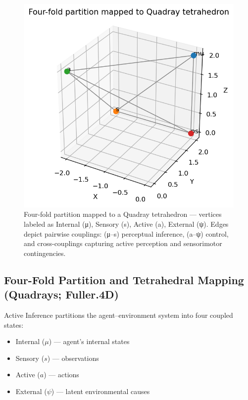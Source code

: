 \documentclass[
]{article}
\providecommand{\tightlist}{%
  \setlength{\itemsep}{0pt}\setlength{\parskip}{0pt}}
\begin{document}
\begin{figure}
\hypertarget{fig:partition_tetrahedron}{%
\centering
\includegraphics{../output/partition_tetrahedron.png}
\caption{Four-fold partition mapped to a Quadray tetrahedron ---
vertices labeled as Internal (μ), Sensory (s), Active (a), External (ψ).
Edges depict pairwise couplings: (μ--s) perceptual inference, (a--ψ)
control, and cross-couplings capturing active perception and
sensorimotor contingencies.}\label{fig:partition_tetrahedron}
}
\end{figure}

\hypertarget{four-fold-partition-and-tetrahedral-mapping-quadrays-fuller.4d}{%
\subsection{Four-Fold Partition and Tetrahedral Mapping (Quadrays;
Fuller.4D)}\label{four-fold-partition-and-tetrahedral-mapping-quadrays-fuller.4d}}

Active Inference partitions the agent--environment system into four
coupled states:

\begin{itemize}
\tightlist
\item
  Internal (\(\mu\)) --- agent's internal states
\item
  Sensory (\(s\)) --- observations
\item
  Active (\(a\)) --- actions
\item
  External (\(\psi\)) --- latent environmental causes
\end{itemize}
\end{document}

